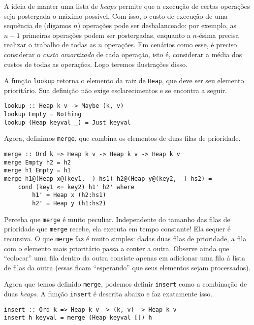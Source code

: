 \documentclass[a4paper]{article}
\begin{document}
A ideia de manter uma lista de \emph{heaps} permite que a execução de certas operações seja postergada o máximo possível.
Com isso, o custo de execução de uma sequência de (digamos $n$) operações pode ser desbalanceado: por exemplo, as $n - 1$ primeiras operações podem ser postergadas, enquanto a $n$-ésima precisa realizar o trabalho de todas as $n$ operações.
Em cenários como esse, é preciso considerar o \emph{custo amortizado} de cada operação, isto é, considerar a média dos custos de todas as operações.
Logo teremos ilustrações disso.

A função \texttt{lookup} retorna o elemento da raiz de \texttt{Heap}, que deve ser seu elemento prioritário.
Sua definição não exige esclarecimentos e se encontra a seguir.

\begin{verbatim}
lookup :: Heap k v -> Maybe (k, v)
lookup Empty = Nothing
lookup (Heap keyval _) = Just keyval
\end{verbatim}

Agora, definimos \texttt{merge}, que combina os elementos de duas filas de prioridade.

\begin{verbatim}
merge :: Ord k => Heap k v -> Heap k v -> Heap k v
merge Empty h2 = h2
merge h1 Empty = h1
merge h1@(Heap x@(key1, _) hs1) h2@(Heap y@(key2, _) hs2) =
	cond (key1 <= key2) h1' h2' where
		h1' = Heap x (h2:hs1)
		h2' = Heap y (h1:hs2)
\end{verbatim}

Perceba que \texttt{merge} é muito peculiar.
Independente do tamanho das filas de prioridade que \texttt{merge} recebe, ela executa em tempo constante!
Ela sequer é recursiva.
O que \texttt{merge} faz é muito simples: dadas duas filas de prioridade, a fila com o elemento mais prioritário passa a conter a outra.
Observe ainda que ``colocar'' uma fila dentro da outra consiste apenas em adicionar uma fila à lista de filas da outra (essas ficam ``esperando'' que seus elementos sejam processados).

Agora que temos definido \texttt{merge}, podemos definir \texttt{insert} como a combinação de duas \emph{heaps}.
A função \texttt{insert} é descrita abaixo e faz exatamente isso.

\begin{verbatim}
insert :: Ord k => Heap k v -> (k, v) -> Heap k v
insert h keyval = merge (Heap keyval []) h
\end{verbatim}
\end{document}
